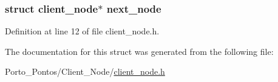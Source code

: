 \subsubsection[{next\+\_\+node}]{\setlength{\rightskip}{0pt plus 5cm}struct {\bf client\+\_\+node}$\ast$ next\+\_\+node}\label{structclient__node_a14ec8f63442dc76813a428c8c762a3a9}


Definition at line 12 of file client\+\_\+node.\+h.



The documentation for this struct was generated from the following file\+:\begin{DoxyCompactItemize}
\item 
Porto\+\_\+\+Pontos/\+Client\+\_\+\+Node/\hyperlink{client__node_8h}{client\+\_\+node.\+h}\end{DoxyCompactItemize}

